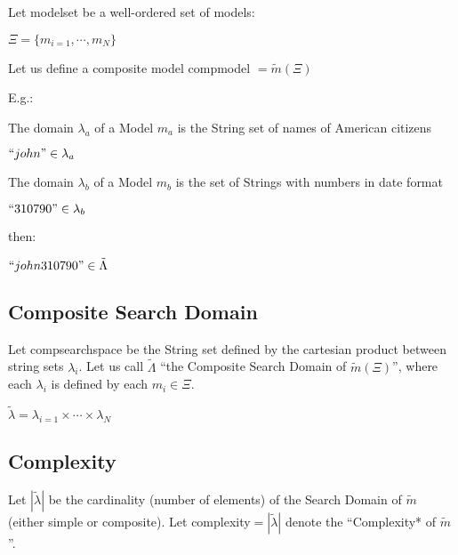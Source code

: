 \documentclass{article}
\begin{document}
Let \gls{modelset} be a well-ordered set of models:

\begin{center}
$\Xi = \{m_{i=1}, \cdots, m_N\}$

\end{center}

Let us define a composite model \gls{compmodel} $ = \tilde{m}(\Xi)$

\begin{center}


\end{center}

\bigskip

E.g.: 

\begin{center}
The domain $\lambda_a $ of a Model $m_a$ is the String set of names of American citizens

$``john" \in \lambda_a$

\hfill \break

The domain $\lambda_b $ of a Model $m_b$ is the set of Strings with numbers in date format

$``310790" \in \lambda_b$

\hfill \break
then:
\hfill \break


$``john310790" \in \tilde\Lambda$
\end{center}

\subsection{Composite Search Domain}

Let \gls{compsearchspace} be the String set defined by the cartesian product between string sets $\lambda_i$. Let us call $\tilde \Lambda$ ``the Composite Search Domain of $\tilde{m}(\Xi)$'', where each $\lambda_i$ is defined by each $m_i \in \Xi$.

\begin{center}

$\tilde\lambda = \lambda_{i=1} \times \cdots \times \lambda_N$

\end{center}

\subsection{Complexity}

Let $|\tilde\lambda|$ be the cardinality (number of elements) of the Search Domain of $\tilde{m}$ (either simple or composite). Let \gls{complexity}$ = |\tilde\lambda|$ denote the ``Complexity* of $\tilde{m}$''.
\end{document}
